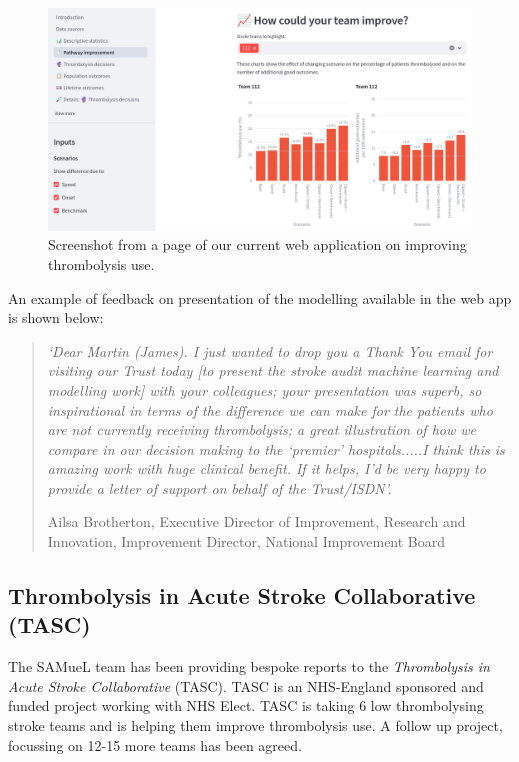 \begin{figure}
    \centering
    \includegraphics[width=0.75\linewidth]{images/web_app.png}
    \caption{Screenshot from a page of our current web application on improving thrombolysis use.}
    \label{fig:web_app}
\end{figure}

An example of feedback on presentation of the modelling available in the web app is shown below:

\begin{minipage}[t]{0.9\textwidth}
\begin{quote}
\textit{`Dear Martin (James). I just wanted to drop you a Thank You email for visiting our Trust today [to present the stroke audit machine learning and modelling work] with your colleagues; your presentation was superb, so inspirational in terms of the difference we can make for the patients who are not currently receiving thrombolysis; a great illustration of how we compare in our decision making to the ‘premier’ hospitals.....I think this is amazing work with huge clinical benefit. If it helps, I’d be very happy to provide a letter of support on behalf of the Trust/ISDN'.}

\vspace{5mm}

Ailsa Brotherton, Executive Director of Improvement, Research and Innovation, Improvement Director, National Improvement Board
\end{quote}
\end{minipage}

\subsection{Thrombolysis in Acute Stroke Collaborative (TASC)}

The SAMueL team has been providing bespoke reports to the \textit{Thrombolysis in Acute Stroke Collaborative} (TASC). TASC is an NHS-England sponsored and funded project working with NHS Elect. TASC is taking 6 low thrombolysing stroke teams and is helping them improve thrombolysis use. A follow up project, focussing on 12-15 more teams has been agreed.

